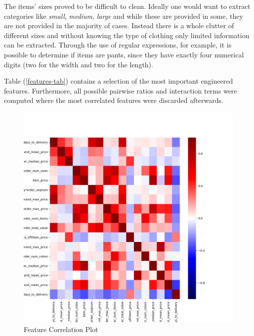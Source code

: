 The items' sizes proved to be difficult to clean. Ideally one would want to extract categories like \textit{small}, \textit{medium}, \textit{large} and while these are provided in some, they are not provided in the majority of cases. Instead there is a whole clutter of different sizes and without knowing the type of clothing only limited information can be extracted. Through the use of regular expressions, for example, it is possible to determine if items are pants, since they have exactly four numerical digits (two for the width and two for the length).

Table (\ref{features-tab}) contains a selection of the most important engineered features. Furthermore, all possible pairwise ratios and interaction terms were computed where the most correlated features were discarded afterwards.

\begin{figure}
\centering
\caption{Feature Correlation Plot}
\includegraphics[scale=0.45]{../eda/corrplot.png}
\end{figure}
